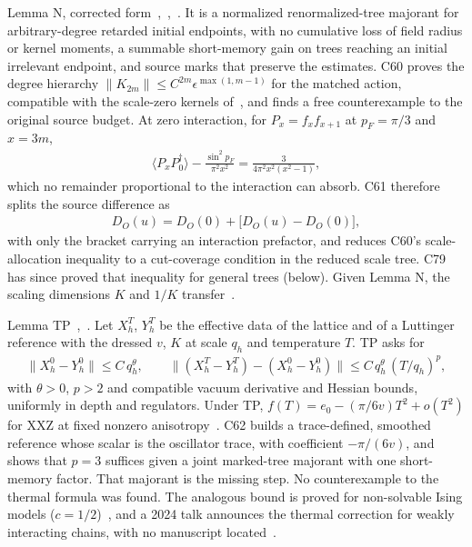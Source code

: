\documentclass[11pt]{article}
\theoremstyle{definition}
\begin{document}
Lemma N, corrected form~\cite[PROOF \S9]{C55},~\cite{C60},~\cite[PROOF \S2]{C61}. It is a normalized renormalized-tree majorant for arbitrary-degree retarded initial endpoints, with no cumulative loss of field radius or kernel moments, a summable short-memory gain on trees reaching an initial irrelevant endpoint, and source marks that preserve the estimates. C60 proves the degree hierarchy $\|K_{2m}\|\le C^{2m}\epsilon^{\max(1,m-1)}$ for the matched action, compatible with the scale-zero kernels of~\cite{BM09}, and finds a free counterexample to the original source budget. At zero interaction, for $P_x=f_xf_{x+1}$ at $p_F=\pi/3$ and $x=3m$,
\begin{align}
\langle P_xP_0^\dagger\rangle-\frac{\sin^2p_F}{\pi^2x^2}=\frac{3}{4\pi^2x^2(x^2-1)},
\label{eq:tail}
\end{align}
which no remainder proportional to the interaction can absorb. C61 therefore splits the source difference as
\begin{align}
D_O(u)=D_O(0)+\big[D_O(u)-D_O(0)\big],
\label{eq:Dsplit}
\end{align}
with only the bracket carrying an interaction prefactor, and reduces C60's scale-allocation inequality to a cut-coverage condition in the reduced scale tree. C79 has since proved that inequality for general trees (below). Given Lemma N, the scaling dimensions $K$ and $1/K$ transfer~\cite[PROOF \S11]{C55}.

Lemma TP~\cite[PROOF \S7]{C59},~\cite[PROOF \S7]{C62}. Let $X_h^T$, $Y_h^T$ be the effective data of the lattice and of a Luttinger reference with the dressed $v$, $K$ at scale $q_h$ and temperature $T$. TP asks for
\begin{align}
\|X_h^0-Y_h^0\|\le C\,q_h^{\theta},\qquad \big\|(X_h^T-Y_h^T)-(X_h^0-Y_h^0)\big\|\le C\,q_h^{\theta}\,(T/q_h)^{p},
\label{eq:TP}
\end{align}
with $\theta>0$, $p>2$ and compatible vacuum derivative and Hessian bounds, uniformly in depth and regulators. Under TP, $f(T)=e_0-(\pi/6v)T^2+o(T^2)$ for XXZ at fixed nonzero anisotropy~\cite{C59}. C62 builds a trace-defined, smoothed reference whose scalar is the oscillator trace, with coefficient $-\pi/(6v)$, and shows that $p=3$ suffices given a joint marked-tree majorant with one short-memory factor. That majorant is the missing step. No counterexample to the thermal formula was found. The analogous bound is proved for non-solvable Ising models ($c=1/2$)~\cite{GM13}, and a 2024 talk announces the thermal correction for weakly interacting chains, with no manuscript located~\cite{Renzi}.
\end{document}
